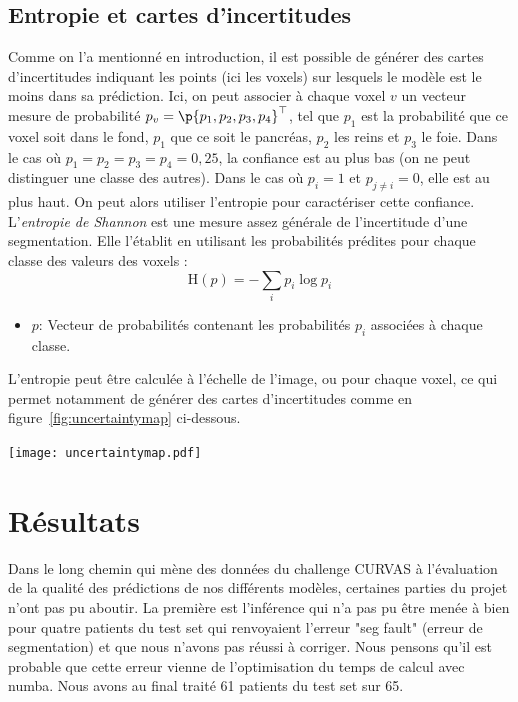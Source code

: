 \documentclass[a4paper,french,bookmarks,12pt]{article}
\begin{document}
        \subsection{Entropie et cartes d'incertitudes}

        Comme on l'a mentionné en introduction, il est possible de générer des cartes d'incertitudes indiquant les points (ici les voxels) sur lesquels le modèle est le moins  dans sa prédiction. Ici, on peut associer à chaque voxel $v$ un vecteur mesure de probabilité $p_v = \p{p_1, p_2, p_3, p_4}^\top$, tel que $p_1$ est la probabilité que ce voxel soit dans le fond, $p_1$ que ce soit le pancréas, $p_2$ les reins et $p_3$ le foie. Dans le cas où $p_1 = p_2 = p_3 = p_4 = 0,25$, la confiance est au plus bas (on ne peut distinguer une classe des autres). Dans le cas où $p_i = 1$ et $p_{j \neq i} = 0$, elle est au plus haut. On peut alors utiliser l'entropie pour caractériser cette confiance. L'\emph{entropie de Shannon} est une mesure assez générale de l'incertitude d'une segmentation. Elle l'établit en utilisant les probabilités prédites pour chaque classe des valeurs des voxels :
        \[ \text{H}(p) = -\sum_{i} p_i \log p_i\]
        \begin{itemize}
            \item \( p \): Vecteur de probabilités contenant les probabilités \(p_i\) associées à chaque classe.
        \end{itemize}
        L'entropie peut être calculée à l'échelle de l'image, ou pour chaque voxel, ce qui permet notamment de générer des cartes d'incertitudes comme en figure~\ref{fig:uncertaintymap} ci-dessous.
        \begin{center}
            \centering
            \texttt{[image: uncertaintymap.pdf]}
            \label{fig:uncertaintymap}
        \end{center}

    \section{Résultats}

    Dans le long chemin qui mène des données du challenge CURVAS à l'évaluation de la qualité des prédictions de nos différents modèles, certaines parties du projet n'ont pas pu aboutir. La première est l'inférence qui n'a pas pu être menée à bien pour quatre patients du test set qui renvoyaient l'erreur "seg fault" (erreur de segmentation) et que nous n'avons pas réussi à corriger. Nous pensons qu'il est probable que cette erreur vienne de l'optimisation du temps de calcul avec numba. Nous avons au final traité 61 patients du test set sur 65.
    
\end{document}
